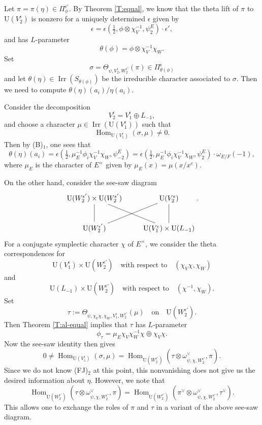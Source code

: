 \documentclass[11pt]{amsart}
\numberwithin{equation}{section}
\theoremstyle{plain}
\theoremstyle{definition}
\theoremstyle{remark}
\def\Hom{\operatorname{Hom}}
\def\Irr{\operatorname{Irr}}
\def\U{\mathrm{U}}
\begin{document}
Let $\pi = \pi(\eta) \in \Pi_{\phi}^{\epsilon'}$. By Theorem \ref{T:equal}, we know that the theta lift of $\pi$ to $\U(V_2^{\epsilon})$ is nonzero for a uniquely determined $\epsilon$ given by
\[  \epsilon  = \epsilon(\tfrac{1}{2}, \phi \otimes \chi_V^{-1},  \psi^E_2) \cdot \epsilon',\]
and has $L$-parameter
\[  \theta(\phi)  =  \phi \otimes \chi_V^{-1} \chi_W. \]
Set
\[  \sigma = \Theta_{\psi, V_2^{\epsilon}, W_2^{\epsilon'}}(\pi) \in \Pi_{\theta(\phi)}^{\epsilon}  \]
and let $\theta(\eta) \in \Irr(S_{\theta(\phi)})$ be the irreducible character associated to $\sigma$. Then we need to compute $\theta(\eta)(a_i) / \eta(a_i)$. 
  
Consider the decomposition
\[  V_2^{\epsilon}  = V_1^{\epsilon}  \oplus L_{-1}, \]
and choose a character $\mu \in \Irr(\U(V_1^{\epsilon}))$ such that
\[   \Hom_{\U(V_1^{\epsilon})}(\sigma,  \mu) \ne 0. \]
Then by (B)$_1$, one sees that
\begin{equation}  \label{E:eta'}
  \theta(\eta)(a_i)  = \epsilon(\tfrac{1}{2}, \mu_E^{-1} \phi_i \chi_V^{-1} \chi_W, \psi^E_{-2})
= \epsilon(\tfrac{1}{2}, \mu_E^{-1} \phi_i \chi_V^{-1} \chi_W, \psi^E_2) \cdot \omega_{E/F}(-1),
\end{equation}
where $\mu_E$ is the character of $E^{\times}$ given by $\mu_E(x) = \mu(x/x^c)$.

On the other hand, consider the see-saw diagram
\[
 \xymatrix{
  \U(W_2^{\epsilon'})  \times \U(W_2^{\epsilon'})  \ar@{-}[dr] \ar@{-}[d] & \U(V^{\epsilon}_2) \ar@{-}[d] \\
  \U(W_2^{\epsilon'}) \ar@{-}[ur] &  \U(V^{\epsilon}_1) \times \U(L_{-1})}.
\]
For a conjugate symplectic character $\chi$ of $E^{\times}$, we consider the theta correspondences for
\[  \U(V_1^{\epsilon} )\times \U(W^{\epsilon'}_2)  \quad \text{with respect to} \quad (\chi_V \chi, \chi_W) \]
and
\[  \U(L_{-1}) \times \U(W_2^{\epsilon'}) \quad \text{with respect to} \quad (\chi^{-1},  \chi_W). \]
Set
\[  \tau :=  \Theta_{\psi, \chi_V \chi, \chi_W, V_1^{\epsilon}, W_2^{\epsilon'}}(\mu) \quad \text{on} \quad \U(W_2^{\epsilon'}). \]
Then Theorem \ref{T:al-equal} implies that $\tau$ has $L$-parameter
\[  \phi_{\tau}  = \mu_E \chi_V \chi_W^{-1}  \chi \oplus \chi_V \chi. \]
Now the see-saw identity then gives
\[  
 0 \ne \Hom_{\U(V_1^{\epsilon})}(\sigma,  \mu)  = \Hom_{\U(W_2^{\epsilon'})}( \tau \otimes \omega_{\psi, \chi, W_2^{\epsilon'}}^{\vee},  \pi). \]
Since we do not know (FJ)$_2$ at this point, this nonvanishing does not give us the desired information about $\eta$. However, we note that
\[   \Hom_{\U(W_2^{\epsilon'})}( \tau \otimes \omega_{\psi, \chi, W_2^{\epsilon'}}^{\vee},  \pi) 
=  \Hom_{\U(W_2^{\epsilon'})}(\pi^{\vee}  \otimes \omega_{\psi, \chi, W_2^{\epsilon'}}^{\vee},  \tau^{\vee}). \]
This allows one to exchange the roles of $\pi$ and $\tau$ in a variant of the above see-saw diagram.
\end{document}
